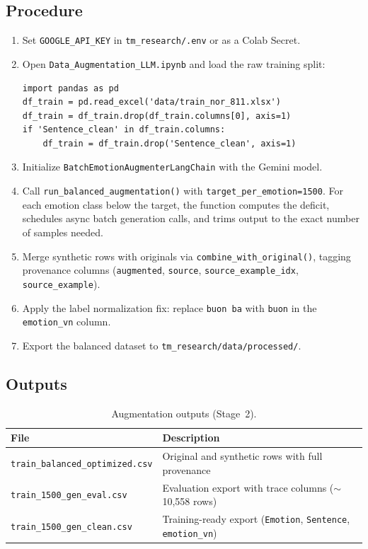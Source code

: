 \documentclass[11pt,a4paper]{article}
\newcommand{\repo}[1]{\texttt{#1}}
\begin{document}
\subsection{Procedure}
\begin{enumerate}[label=\arabic*.]
  \item Set \texttt{GOOGLE\_API\_KEY} in \repo{tm\_research/.env} or as a Colab Secret.
  \item Open \repo{Data\_Augmentation\_LLM.ipynb} and load the raw training split:
  \begin{lstlisting}
import pandas as pd
df_train = pd.read_excel('data/train_nor_811.xlsx')
df_train = df_train.drop(df_train.columns[0], axis=1)
if 'Sentence_clean' in df_train.columns:
    df_train = df_train.drop('Sentence_clean', axis=1)
  \end{lstlisting}
  \item Initialize \texttt{BatchEmotionAugmenterLangChain} with the Gemini model.
  \item Call \texttt{run\_balanced\_augmentation()} with \texttt{target\_per\_emotion=1500}. For each emotion class below the target, the function computes the deficit, schedules async batch generation calls, and trims output to the exact number of samples needed.
  \item Merge synthetic rows with originals via \texttt{combine\_with\_original()}, tagging provenance columns (\texttt{augmented}, \texttt{source}, \texttt{source\_example\_idx}, \texttt{source\_example}).
  \item Apply the label normalization fix: replace \texttt{buon ba} with \texttt{buon} in the \texttt{emotion\_vn} column.
  \item Export the balanced dataset to \repo{tm\_research/data/processed/}.
\end{enumerate}

\subsection{Outputs}
\begin{table}[htbp]
  \centering
  \caption{Augmentation outputs (Stage~2).}
  \label{tab:augmentation-outputs}
  \begin{tabular}{@{}ll@{}}
    \toprule
    File & Description \\
    \midrule
    \repo{train\_balanced\_optimized.csv} & Original and synthetic rows with full provenance \\
    \repo{train\_1500\_gen\_eval.csv} & Evaluation export with trace columns ($\sim$10{,}558 rows) \\
    \repo{train\_1500\_gen\_clean.csv} & Training-ready export (\texttt{Emotion}, \texttt{Sentence}, \texttt{emotion\_vn}) \\
    \bottomrule
  \end{tabular}
\end{table}
\end{document}
